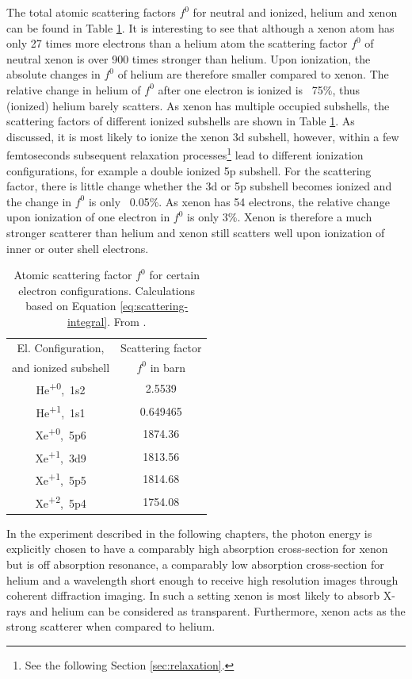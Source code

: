 The total atomic scattering factors $f^{0}$ for neutral and ionized, helium and xenon can be found in Table \ref{tab:helium-xenon-el-scattering-crossection}. It is interesting to see that although a xenon atom has only 27 times more electrons than a helium atom the scattering factor $f^{0}$ of neutral xenon is over 900 times stronger than helium. Upon ionization, the absolute changes in $f^{0}$ of helium are therefore smaller compared to xenon. The relative change in helium of $f^{0}$ after one electron is ionized is ~75\%, thus (ionized) helium barely scatters. As xenon has multiple occupied subshells, the scattering factors of different ionized subshells are shown in Table \ref{tab:helium-xenon-el-scattering-crossection}. As discussed, it is most likely to ionize the xenon 3d subshell, however, within a few femtoseconds subsequent relaxation processes\footnote{See the following Section \ref{sec:relaxation}.} lead to different ionization configurations, for example a double ionized 5p subshell. For the scattering factor, there is little change whether the 3d or 5p subshell becomes ionized and the change in $f^{0}$ is only ~0.05\%. As xenon has 54 electrons, the relative change upon ionization of one electron in $f^{0}$ is only 3\%. Xenon is therefore a much stronger scatterer than helium and xenon still scatters well upon ionization of inner or outer shell electrons.  
\begin{table}
	\centering
		\begin{tabular}{ | c | c | }
		\hline
			El. Configuration, & Scattering factor \\
			and ionized subshell & $f^{0}$ in barn \\ \hline
			He\textsuperscript{+0},\ 1s2 & 2.5539  \\ \hline
			He\textsuperscript{+1},\ 1s1 & 0.649465  \\ \hline
			Xe\textsuperscript{+0},\ 5p6 & 1874.36  \\ \hline
			Xe\textsuperscript{+1},\ 3d9 & 1813.56  \\ \hline
			Xe\textsuperscript{+1},\ 5p5 & 1814.68  \\ \hline
			Xe\textsuperscript{+2},\ 5p4 & 1754.08  \\ \hline
		\end{tabular}
	\caption[Atomic scattering factors for helium and xenon.]{Atomic scattering factor $f^{0}$ for certain electron configurations. Calculations based on Equation \eqref{eq:scattering-integral}. From \cite{Ho-2016-PC}.}
	\label{tab:helium-xenon-el-scattering-crossection}
\end{table}
In the experiment described in the following chapters, the photon energy is explicitly chosen to have a comparably high absorption cross-section for xenon but is off absorption resonance, a comparably low absorption cross-section for helium and a wavelength short enough to receive high resolution images through coherent diffraction imaging. In such a setting xenon is most likely to absorb X-rays and helium can be considered as transparent. Furthermore, xenon acts as the strong scatterer when compared to helium.
%
%
%
%
%
